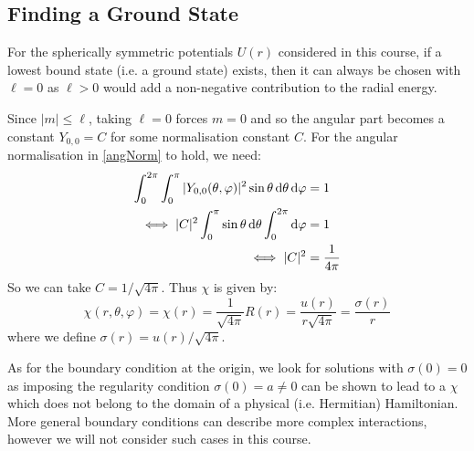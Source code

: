 \documentclass[../main.tex]{subfiles}
\begin{document}
\subsection{Finding a Ground State}
For the spherically symmetric potentials $U(r)$ considered in this course, if a lowest bound state (i.e. a ground state) exists, then it can always be chosen with $\ell = 0$ as $\ell > 0$ would add a non-negative contribution to the radial energy.

Since $|m| \leq \ell$, taking $\ell = 0$ forces $m = 0$ and so the angular part becomes  a constant $Y_{0, 0} = C$ for some normalisation constant $C$.
For the angular normalisation in \cref{angNorm} to hold, we need:
\begin{align*}
  \int_{0}^{2\pi} \int_{0}^{\pi} |Y_{0, 0}(\theta, \varphi)|^2 \sin \theta \d{\theta} \d{\varphi} &= 1 \\
  \iff |C|^2 \int_{0}^{\pi} \sin \theta \d{\theta} \int_{0}^{2\pi} \d{\varphi} &= 1 \\
  \iff |C|^2 &= \frac{1}{4 \pi}
\end{align*}
So we can take $C = 1/\sqrt{4\pi}$.
Thus $\chi$ is given by:
\[
  \chi(r, \theta, \varphi) = \chi(r) = \frac{1}{\sqrt{4\pi}} R(r) = \frac{u(r)}{r\sqrt{4\pi}} = \frac{\sigma(r)}{r}
\]
where we define $\sigma(r) = u(r) / \sqrt{4\pi}$.

As for the boundary condition at the origin, we look for solutions with $\sigma(0) = 0$ as imposing the regularity condition $\sigma(0) = a \neq 0$ can be shown to lead to a $\chi$ which does not belong to the domain of a physical (i.e. Hermitian) Hamiltonian.
More general boundary conditions can describe more complex interactions, however we will not consider such cases in this course.
\end{document}
